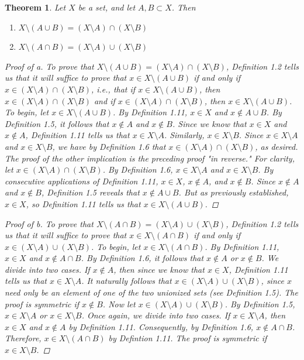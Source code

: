 \documentclass[titlepage]{article}
\newcounter{script}
\newtheorem{theorem}{Theorem}[script]
\theoremstyle{definition}
\begin{document}
\begin{theorem}
    Let $X$ be a set, and let $A,B\subset X$. Then
    \begin{enumerate}[label={\alph*\textup{)}}]
        \item $X\setminus(A\cup B)=(X\setminus A)\cap(X\setminus B)$
        \item $X\setminus(A\cap B)=(X\setminus A)\cup(X\setminus B)$
    \end{enumerate}
    \begin{proof}[Proof of a]
        To prove that $X\setminus(A\cup B)=(X\setminus A)\cap(X\setminus B)$, Definition 1.2 tells us that it will suffice to prove that $x\in X\setminus(A\cup B)$ if and only if $x\in (X\setminus A)\cap(X\setminus B)$, i.e., that if $x\in X\setminus(A\cup B)$, then $x\in (X\setminus A)\cap(X\setminus B)$ and if $x\in (X\setminus A)\cap(X\setminus B)$, then $x\in X\setminus(A\cup B)$. To begin, let $x\in X\setminus(A\cup B)$. By Definition 1.11, $x\in X$ and $x\notin A\cup B$. By Definition 1.5, it follows that $x\notin A$ and $x\notin B$. Since we know that $x\in X$ and $x\notin A$, Definition 1.11 tells us that $x\in X\setminus A$. Similarly, $x\in X\setminus B$. Since $x\in X\setminus A$ and $x\in X\setminus B$, we have by Definition 1.6 that $x\in(X\setminus A)\cap(X\setminus B)$, as desired. The proof of the other implication is the preceding proof "in reverse." For clarity, let $x\in(X\setminus A)\cap(X\setminus B)$. By Definition 1.6, $x\in X\setminus A$ and $x\in X\setminus B$. By consecutive applications of Definition 1.11, $x\in X$, $x\notin A$, and $x\notin B$. Since $x\notin A$ and $x\notin B$, Definition 1.5 reveals that $x\notin A\cup B$. But as previously established, $x\in X$, so Definition 1.11 tells us that $x\in X\setminus(A\cup B)$.
    \end{proof}
    \begin{proof}[Proof of b]
        To prove that $X\setminus(A\cap B)=(X\setminus A)\cup(X\setminus B)$, Definition 1.2 tells us that it will suffice to prove that $x\in X\setminus(A\cap B)$ if and only if $x\in (X\setminus A)\cup(X\setminus B)$. To begin, let $x\in X\setminus(A\cap B)$. By Definition 1.11, $x\in X$ and $x\notin A\cap B$. By Definition 1.6, it follows that $x\notin A$ or $x\notin B$. We divide into two cases. If $x\notin A$, then since we know that $x\in X$, Definition 1.11 tells us that $x\in X\setminus A$. It naturally follows that $x\in(X\setminus A)\cup(X\setminus B)$, since $x$ need only be an element of one of the two unionized sets (see Definition 1.5). The proof is symmetric if $x\notin B$. Now let $x\in(X\setminus A)\cup(X\setminus B)$. By Definition 1.5, $x\in X\setminus A$ or $x\in X\setminus B$. Once again, we divide into two cases. If $x\in X\setminus A$, then $x\in X$ and $x\notin A$ by Definition 1.11. Consequently, by Definition 1.6, $x\notin A\cap B$. Therefore, $x\in X\setminus(A\cap B)$ by Defintion 1.11. The proof is symmetric if $x\in X\setminus B$.
    \end{proof}
\end{theorem}
\end{document}
